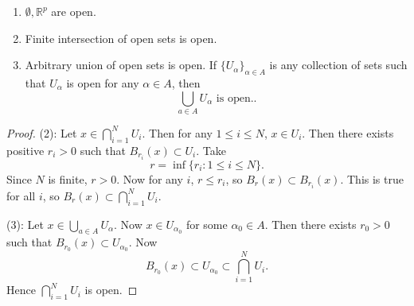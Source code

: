 \begin{proposition}
	\begin{enumerate}
		\item $\emptyset , \mathbb{R}^p$ are open.
		\item Finite intersection of open sets is open.
		\item Arbitrary union of open sets is open. If $\{U_\alpha\}_{\alpha\in A}$ is any collection of sets such that $U_\alpha$ is open for any $\alpha \in A$, then \[
			\bigcup_{a \in A} U_\alpha \text{ is open.}
		.\]
	\end{enumerate}
\end{proposition}
\begin{proof}
	(2):
	Let $x \in \bigcap_{i=1}^N U_i$. Then for any $1\le i\le N$, $x \in U_i$. Then there exists positive $r_i>0$ such that $B_{r_i}(x) \subset U_i$. Take \[
		r = \operatorname{inf} \{r_i: 1\le i\le N\}
	.\] 
	Since $N$ is finite, $r > 0$. Now for any $i$, $r\le r_i$, so $B_{r}(x)\subset B_{r_i}(x)$. This is true for all $i$, so $B_r(x) \subset \bigcap_{i=1}^N U_i$.

	(3): 
	Let $x \in \bigcup_{a \in A} U_\alpha$. Now $x \in U_{\alpha_0}$ for some $\alpha_0 \in A$. Then there exists $r_0>0$ such that $B_{r_0}(x) \subset U_{\alpha_0}$.
Now
\[
	B_{r_0}(x) \subset U_{\alpha_0} \subset \bigcap_{i=1}^N U_i
.\] 
Hence  $\bigcap_{i=1}^N U_i$ is open.
\end{proof}

